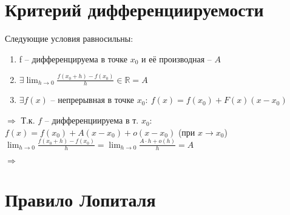 \section{Критерий дифференциируемости}
\begin{theorem}
Следующие условия равносильны:
\begin{enumerate}
\item f -- дифференцируема в точке $x_0$  и её производная -- $A$
\item $\displaystyle \exists \lim_{h \to 0} \frac{f(x_0 + h) - f(x_0)}{h} \in \mathbb{R} = A$
\item $\exists f(x)$ -- непрерывная в точке $x_0:\ f(x) = f(x_0) + F(x)(x - x_0)$
\end{enumerate}
\end{theorem}
 $\Longrightarrow$ \newline
Т.к. $f$ -- дифференциируема в т. $x_0$:\newline
$f(x) = f(x_0) + A(x - x_0) + o(x - x_0)$ (при $x \to x_0$)\newline
$\displaystyle \lim_{h \to 0} \frac{f(x_0 + h) - f(x_0)}{h} = \lim_{h\to 0} \frac{A\cdot h + 
o(h)}{h} = A$\newline\newline

 $\Longrightarrow$ \newline



\section{Правило Лопиталя}
